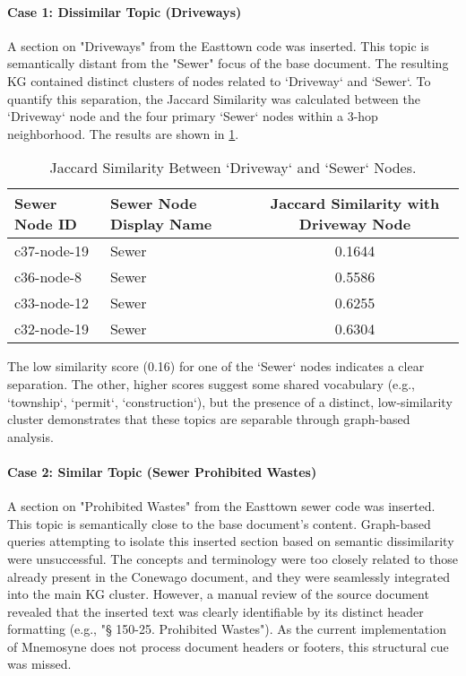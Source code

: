\paragraph{Case 1: Dissimilar Topic (Driveways)}
A section on "Driveways" from the Easttown code was inserted. This topic is semantically distant from the "Sewer" focus of the base document. The resulting KG contained distinct clusters of nodes related to `Driveway` and `Sewer`. To quantify this separation, the Jaccard Similarity was calculated between the `Driveway` node and the four primary `Sewer` nodes within a 3-hop neighborhood. The results are shown in \cref{tab:jaccard_driveway}.

\begin{table}[!htbp]
\centering
\caption{Jaccard Similarity Between `Driveway` and `Sewer` Nodes.}
\label{tab:jaccard_driveway}
\begin{tabular}{@{}llc@{}}
\toprule
\textbf{Sewer Node ID} & \textbf{Sewer Node Display Name} & \textbf{Jaccard Similarity with Driveway Node} \\ \midrule
c37-node-19 & Sewer & 0.1644 \\
c36-node-8  & Sewer & 0.5586 \\
c33-node-12 & Sewer & 0.6255 \\
c32-node-19 & Sewer & 0.6304 \\ \bottomrule
\end{tabular}
\end{table}

The low similarity score (0.16) for one of the `Sewer` nodes indicates a clear separation. The other, higher scores suggest some shared vocabulary (e.g., `township`, `permit`, `construction`), but the presence of a distinct, low-similarity cluster demonstrates that these topics are separable through graph-based analysis.

\paragraph{Case 2: Similar Topic (Sewer Prohibited Wastes)}
A section on "Prohibited Wastes" from the Easttown sewer code was inserted. This topic is semantically close to the base document's content. Graph-based queries attempting to isolate this inserted section based on semantic dissimilarity were unsuccessful. The concepts and terminology were too closely related to those already present in the Conewago document, and they were seamlessly integrated into the main KG cluster. However, a manual review of the source document revealed that the inserted text was clearly identifiable by its distinct header formatting (e.g., "§ 150-25. Prohibited Wastes"). As the current implementation of Mnemosyne does not process document headers or footers, this structural cue was missed.

